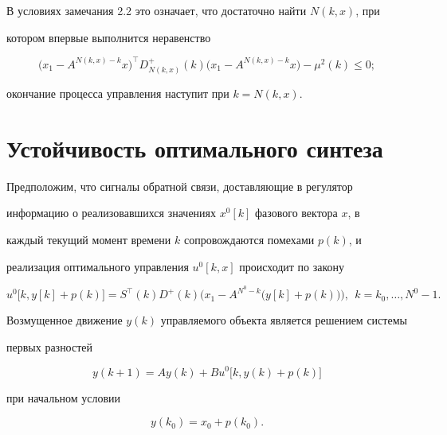 В условиях замечания 2.2 это означает, что достаточно найти $N(k,x)$, при


котором впервые выполнится неравенство


$$


\bigl(x_1-A^{N(k, x)-k} x\bigr)^{\top}


D^+_{N(k, x)}(k)\bigl(x_1-A^{N(k, x)-k} x\bigr)-\mu^2(k)\le0;


$$


окончание процесса управления наступит при $k=N(k, x)$.





\section{Устойчивость оптимального синтеза}





Предположим, что сигналы обратной связи, доставляющие в регулятор


информацию о реализовавшихся значениях $x^0[k]$ фазового вектора $x$, в


каждый текущий момент времени $k$ сопровождаются помехами $p(k)$, и


реализация оптимального управления $u^0[k, x]$ происходит по закону


\begin{equation}\label{5.11}


u^0\bigl[k,y[k]+p(k)\bigr]=S^{\top}(k)D^+(k)\bigl(x_1-A^{N^0-k}\bigl(y[k]+p(k)


\bigr)\bigr),\ \ k=k_0,\dotsc, N^0-1.


\end{equation}


Возмущенное движение $y(k)$ управляемого объекта является решением системы


первых разностей


\begin{equation}\label{4.1}


y(k+1)=Ay(k)+Bu^0\bigl[k, y(k)+p(k)\bigr]


\end{equation}


при начальном условии


\begin{equation}\label{4.2}


y(k_0)=x_0+p(k_0).


\end{equation}


